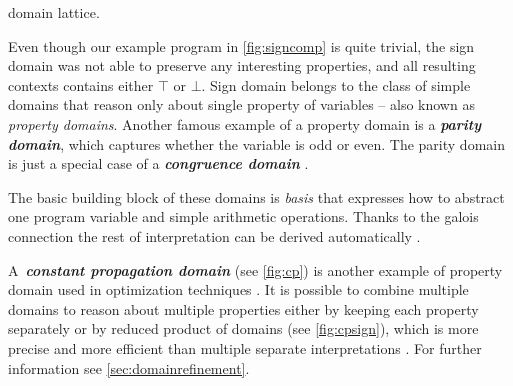 \begin{marginfigure}%
    \centering
{}
    \caption{ domain lattice.}
    \label{fig:cp}%
\end{marginfigure}%

Even though our example program in \autoref{fig:signcomp} is quite trivial, the
sign domain  was not able to preserve any interesting properties,
and all resulting contexts contains either $\top$ or $\bot$.  Sign domain belongs to
the class of simple domains that reason only about single property of variables --
also known as \emph{property domains}. Another famous example of a property
domain is a \textbf{\emph{parity domain}}, which captures whether the
variable is odd or even. The parity domain is just a special case of a
\textbf{\emph{congruence domain}} \cite{Granger1989, Granger1991}.

The basic building block of these domains is \emph{basis} that expresses how to
abstract one program variable and simple arithmetic operations. Thanks to
the galois connection the rest of interpretation can be derived automatically
\cite{Mine2004Thesis}.

A~\textbf{\emph{constant propagation domain}}  (see
\autoref{fig:cp}) is another example of property domain used in optimization
techniques \cite{Kildall1973}.  It is possible to combine multiple domains to
reason about multiple properties either by keeping each property separately or
by reduced product of domains (see \autoref{fig:cpsign}), which is more precise
and more efficient than multiple separate interpretations \cite{Cousot2011b}.
For further information see \autoref{sec:domainrefinement}.

